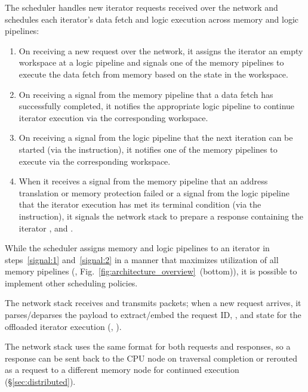  The scheduler handles new iterator requests received over the network and schedules each iterator's data fetch and logic execution across memory and logic pipelines: 
\begin{enumerate}[leftmargin=*, itemsep=0pt]
  \item On receiving a new request over the network, it assigns the iterator an empty workspace at a logic pipeline and signals one of the memory pipelines to execute the data fetch from memory based on the state in the workspace.\label{signal:1}
  \item On receiving a signal from the memory pipeline that a data fetch has successfully completed, it notifies the appropriate logic pipeline to continue iterator execution via the corresponding workspace.
  \item On receiving a signal from the logic pipeline that the next iteration can be started (via the  instruction), it notifies one of the memory pipelines to execute  via the corresponding workspace.\label{signal:2}
  \item When it receives a signal from the memory pipeline that an address translation or memory protection failed or a signal from the logic pipeline that the iterator execution has met its terminal condition (via the  instruction), it signals the network stack to prepare a response containing the iterator ,  and .
\end{enumerate}
\noindent
While the scheduler assigns memory and logic pipelines to an iterator in steps~\ref{signal:1} and~\ref{signal:2} in a manner that maximizes utilization of all memory pipelines (\ie, Fig.~\ref{fig:architecture_overview}~(bottom)), it is possible to implement other scheduling policies.


 The network stack receives and transmits packets; when a new request arrives, it parses/deparses the payload to extract/embed the request ID, , and state for the offloaded iterator execution (, ). 

The network stack uses the same format for both requests and responses, so a response can be sent back to the CPU node on traversal completion or rerouted as a request to a different memory node for continued execution (\S\ref{sec:distributed}).


